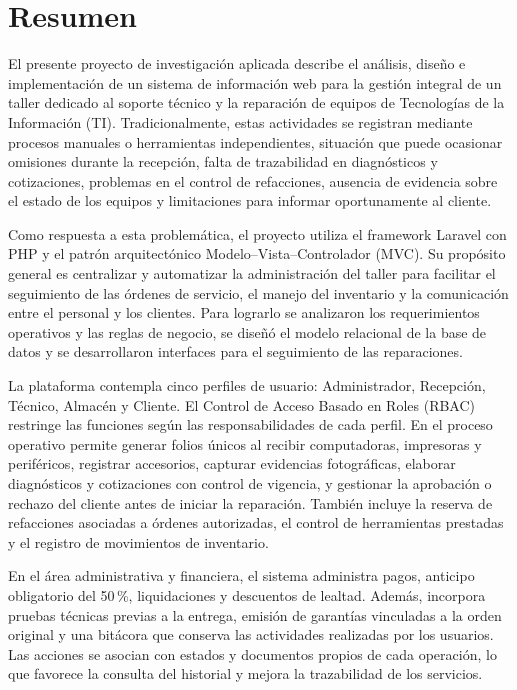 \section*{Resumen}

El presente proyecto de investigación aplicada describe el análisis, diseño e implementación de un sistema de información web para la gestión integral de un taller dedicado al soporte técnico y la reparación de equipos de Tecnologías de la Información (TI). Tradicionalmente, estas actividades se registran mediante procesos manuales o herramientas independientes, situación que puede ocasionar omisiones durante la recepción, falta de trazabilidad en diagnósticos y cotizaciones, problemas en el control de refacciones, ausencia de evidencia sobre el estado de los equipos y limitaciones para informar oportunamente al cliente.

Como respuesta a esta problemática, el proyecto utiliza el framework Laravel con PHP y el patrón arquitectónico Modelo--Vista--Controlador (MVC). Su propósito general es centralizar y automatizar la administración del taller para facilitar el seguimiento de las órdenes de servicio, el manejo del inventario y la comunicación entre el personal y los clientes. Para lograrlo se analizaron los requerimientos operativos y las reglas de negocio, se diseñó el modelo relacional de la base de datos y se desarrollaron interfaces para el seguimiento de las reparaciones.

La plataforma contempla cinco perfiles de usuario: Administrador, Recepción, Técnico, Almacén y Cliente. El Control de Acceso Basado en Roles (RBAC) restringe las funciones según las responsabilidades de cada perfil. En el proceso operativo permite generar folios únicos al recibir computadoras, impresoras y periféricos, registrar accesorios, capturar evidencias fotográficas, elaborar diagnósticos y cotizaciones con control de vigencia, y gestionar la aprobación o rechazo del cliente antes de iniciar la reparación. También incluye la reserva de refacciones asociadas a órdenes autorizadas, el control de herramientas prestadas y el registro de movimientos de inventario.

En el área administrativa y financiera, el sistema administra pagos, anticipo obligatorio del 50\,\%, liquidaciones y descuentos de lealtad. Además, incorpora pruebas técnicas previas a la entrega, emisión de garantías vinculadas a la orden original y una bitácora que conserva las actividades realizadas por los usuarios. Las acciones se asocian con estados y documentos propios de cada operación, lo que favorece la consulta del historial y mejora la trazabilidad de los servicios.


